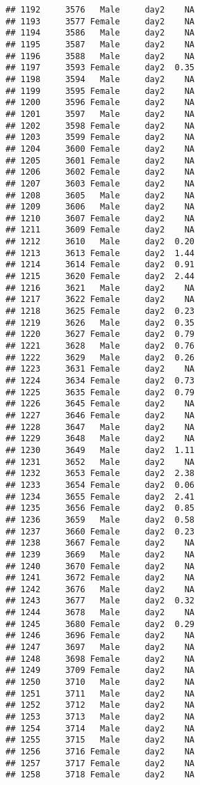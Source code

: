 \documentclass[
]{article}
\begin{document}
\begin{verbatim}
## 1192     3576   Male     day2    NA
## 1193     3577 Female     day2    NA
## 1194     3586   Male     day2    NA
## 1195     3587   Male     day2    NA
## 1196     3588   Male     day2    NA
## 1197     3593 Female     day2  0.35
## 1198     3594   Male     day2    NA
## 1199     3595 Female     day2    NA
## 1200     3596 Female     day2    NA
## 1201     3597   Male     day2    NA
## 1202     3598 Female     day2    NA
## 1203     3599 Female     day2    NA
## 1204     3600 Female     day2    NA
## 1205     3601 Female     day2    NA
## 1206     3602 Female     day2    NA
## 1207     3603 Female     day2    NA
## 1208     3605   Male     day2    NA
## 1209     3606   Male     day2    NA
## 1210     3607 Female     day2    NA
## 1211     3609 Female     day2    NA
## 1212     3610   Male     day2  0.20
## 1213     3613 Female     day2  1.44
## 1214     3614 Female     day2  0.91
## 1215     3620 Female     day2  2.44
## 1216     3621   Male     day2    NA
## 1217     3622 Female     day2    NA
## 1218     3625 Female     day2  0.23
## 1219     3626   Male     day2  0.35
## 1220     3627 Female     day2  0.79
## 1221     3628   Male     day2  0.76
## 1222     3629   Male     day2  0.26
## 1223     3631 Female     day2    NA
## 1224     3634 Female     day2  0.73
## 1225     3635 Female     day2  0.79
## 1226     3645 Female     day2    NA
## 1227     3646 Female     day2    NA
## 1228     3647   Male     day2    NA
## 1229     3648   Male     day2    NA
## 1230     3649   Male     day2  1.11
## 1231     3652   Male     day2    NA
## 1232     3653 Female     day2  2.38
## 1233     3654 Female     day2  0.06
## 1234     3655 Female     day2  2.41
## 1235     3656 Female     day2  0.85
## 1236     3659   Male     day2  0.58
## 1237     3660 Female     day2  0.23
## 1238     3667 Female     day2    NA
## 1239     3669   Male     day2    NA
## 1240     3670 Female     day2    NA
## 1241     3672 Female     day2    NA
## 1242     3676   Male     day2    NA
## 1243     3677   Male     day2  0.32
## 1244     3678   Male     day2    NA
## 1245     3680 Female     day2  0.29
## 1246     3696 Female     day2    NA
## 1247     3697   Male     day2    NA
## 1248     3698 Female     day2    NA
## 1249     3709 Female     day2    NA
## 1250     3710   Male     day2    NA
## 1251     3711   Male     day2    NA
## 1252     3712   Male     day2    NA
## 1253     3713   Male     day2    NA
## 1254     3714   Male     day2    NA
## 1255     3715   Male     day2    NA
## 1256     3716 Female     day2    NA
## 1257     3717 Female     day2    NA
## 1258     3718 Female     day2    NA

\end{verbatim}
\end{document}
